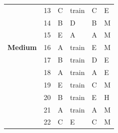 \documentclass[pageno]{jpaper}
\begin{document}
\begin{table}[]
\begin{tabular}{llllll}
\textbf{}                & 13                                  & C                                          & train                                       & C                                           & E                                       \\
\textbf{}                & 14                                  & B                                          & D                                           & B                                           & M                                       \\
\textbf{}                & 15                                  & E                                          & A                                           & A                                           & M                                       \\
\textbf{Medium}          & 16                                  & A                                          & train                                       & E                                           & M                                       \\
\textbf{}                & 17                                  & B                                          & train                                       & D                                           & E                                       \\
\textbf{}                & 18                                  & A                                          & train                                       & A                                           & E                                       \\
\textbf{}                & 19                                  & E                                          & train                                       & C                                           & M                                       \\
\textbf{}                & 20                                  & B                                          & train                                       & E                                           & H                                       \\
\textbf{}                & 21                                  & A                                          & train                                       & A                                           & M                                       \\
\textbf{}                & 22                                  & C                                          & E                                           & C                                           & M                                       \\

\end{tabular}
\end{table}
\end{document}
